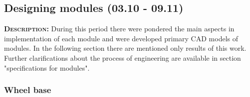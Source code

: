 \subsection{Designing modules (03.10 - 09.11)}
	\textsc{\textbf{Description:}} During this period there were pondered the main aspects in implementation of each module and were developed primary CAD models of modules. In the following section there are mentioned only results of this work. Further clarifications about the process of engineering are available in section "specifications for modules".\newline
	
	\subsubsection{Wheel base}
  
\fillpage
